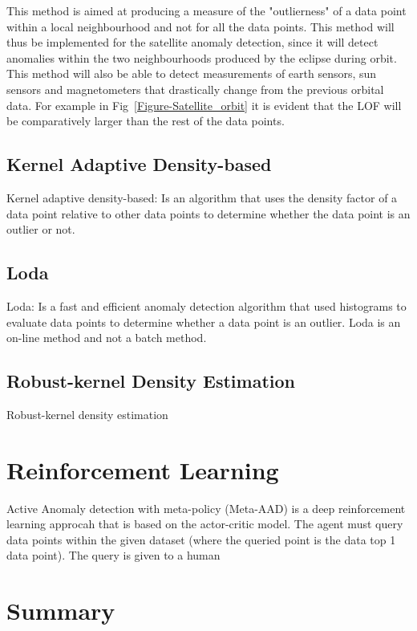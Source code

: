 This method is aimed at producing a measure of the "outlierness" of a data point within a local neighbourhood and not for all the data points. This method will thus be implemented for the satellite anomaly detection, since it will detect anomalies within the two neighbourhoods produced by the eclipse during orbit. This method will also be able to detect measurements of earth sensors, sun sensors and magnetometers that drastically change from the previous orbital data. For example in Fig~\ref{Figure-Satellite_orbit} it is evident that the LOF will be comparatively larger than the rest of the data points. 

\subsection{Kernel Adaptive Density-based}
Kernel adaptive density-based: Is an algorithm that uses the density factor of a data point relative to other data points to determine whether the data point is an outlier or not.

\subsection{Loda}
Loda: Is a fast and efficient anomaly detection algorithm that used histograms to evaluate data points to determine whether a data point is an outlier. Loda is an on-line method and not a batch method.

\subsection{Robust-kernel Density Estimation}
Robust-kernel density estimation

\section{Reinforcement Learning}
Active Anomaly detection with meta-policy (Meta-AAD) is a deep reinforcement learning approcah that is based on the actor-critic model. The agent must query data points within the given dataset (where the queried point is the data top 1 data point). The query is given to a human 


\section{Summary}

